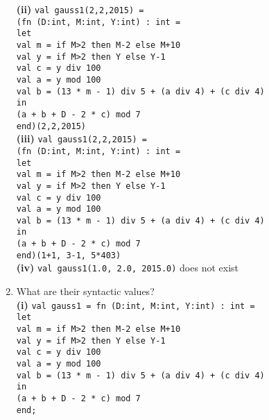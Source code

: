 \documentclass[11pt]{article}
\renewcommand{\part}[1] {\vspace{.10in} {\bf (#1)}}
\begin{document}
\begin{enumerate}
\part{ii} \verb|val gauss1(2,2,2015) =|\\
    \verb|(fn (D:int, M:int, Y:int) : int =|\\ 
    \verb|let|\\
    \verb|val m = if M>2 then M-2 else M+10|\\
    \verb|val y = if M>2 then Y else Y-1|\\
    \verb|val c = y div 100|\\
    \verb|val a = y mod 100|\\
    \verb|val b = (13 * m - 1) div 5 + (a div 4) + (c div 4)|\\
    \verb|in|\\
    \verb|(a + b + D - 2 * c) mod 7|\\
    \verb|end)(2,2,2015)|\\
\part{iii} \verb|val gauss1(2,2,2015) =|\\
    \verb|(fn (D:int, M:int, Y:int) : int =|\\ 
    \verb|let|\\
    \verb|val m = if M>2 then M-2 else M+10|\\
    \verb|val y = if M>2 then Y else Y-1|\\
    \verb|val c = y div 100|\\
    \verb|val a = y mod 100|\\
    \verb|val b = (13 * m - 1) div 5 + (a div 4) + (c div 4)|\\
    \verb|in|\\
    \verb|(a + b + D - 2 * c) mod 7|\\
    \verb|end)(1+1, 3-1, 5*403)|\\
\part{iv} \verb|val gauss1(1.0, 2.0, 2015.0)| does not exist
\item What are their syntactic values?\\
\part{i} \verb|val gauss1 = fn (D:int, M:int, Y:int) : int =|\\ 
    \verb|let|\\
    \verb|val m = if M>2 then M-2 else M+10|\\
    \verb|val y = if M>2 then Y else Y-1|\\
    \verb|val c = y div 100|\\
    \verb|val a = y mod 100|\\
    \verb|val b = (13 * m - 1) div 5 + (a div 4) + (c div 4)|\\
    \verb|in|\\
    \verb|(a + b + D - 2 * c) mod 7|\\
    \verb|end;|\\

\end{enumerate}
\end{document}
